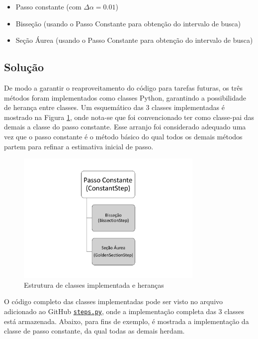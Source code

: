 \documentclass[10pt, a4paper]{article}
\begin{document}
\begin{itemize}
  \item Passo constante (com $\Delta\alpha = 0.01$)
  \item Bisseção (usando o Passo Constante para obtenção do intervalo de busca)
  \item Seção Áurea (usando o Passo Constante para obtenção do intervalo de busca)
\end{itemize}

\subsection{Solução}

De modo a garantir o reaproveitamento do código para tarefas futuras, os três métodos foram implementados como classes Python, garantindo a 
possibilidade de herança entre classes. Um esquemático das 3 classes implementadas é mostrado na Figura \ref{fig:q1_1}, onde nota-se que foi convencionado
ter como classe-pai das demais a classe do passo constante. Esse arranjo foi considerado adequado uma vez que o passo constante é o método básico do qual todos
os demais métodos partem para refinar a estimativa inicial de passo.

\begin{figure}
  \centering
  \includegraphics[width=0.8\textwidth]{images/classes.pdf}
  \caption{Estrutura de classes implementada e heranças}
  \label{fig:q1_1}
\end{figure}

O código completo das classes implementadas pode ser visto no arquivo adicionado ao GitHub 
{\tt \href{https://github.com/prj-phcp/MEC2403_Activities/blob/master/packages/steps.py}{steps.py}},
onde a implementação completa das 3 classes está armazenada. Abaixo, para fins de exemplo, é mostrada a implementação da classe de passo constante, da qual todas 
as demais herdam.
\end{document}
